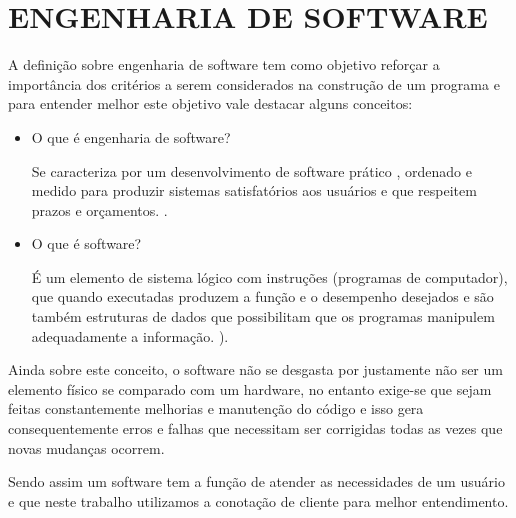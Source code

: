 \documentclass[
	12pt,				%
	oneside,			%
	a4paper,			%
  section=TITLE,
	brazil,				%
	]{abntex2}
\begin{document}
\section{ENGENHARIA DE SOFTWARE}

A definição sobre engenharia de software tem como objetivo reforçar a
importância dos critérios a serem considerados na construção de um programa e
para entender melhor este objetivo vale destacar alguns conceitos:

\begin{itemize}
  \item O que é engenharia de software?
    \begin{citacao}
      Se caracteriza por um desenvolvimento de software prático , ordenado e
      medido para produzir sistemas satisfatórios aos usuários e que respeitem
      prazos e orçamentos. \cite{pressman}.
    \end{citacao}

  \item O que é software?
    \begin{citacao}
      É um elemento de sistema lógico com instruções (programas de computador), que
      quando executadas produzem a função e o desempenho desejados e são também
      estruturas de dados que possibilitam que os programas manipulem adequadamente
      a informação. \cite{pressman}).
    \end{citacao}
\end{itemize}


Ainda sobre este conceito, o software não se desgasta por justamente não ser um
elemento físico se comparado com um hardware, no entanto exige-se que sejam
feitas constantemente melhorias e manutenção do código e isso gera
consequentemente erros e falhas que necessitam ser corrigidas todas as vezes
que novas mudanças ocorrem.

Sendo assim um software tem a função de atender as necessidades de um usuário e
que neste trabalho utilizamos a conotação de cliente para melhor entendimento.




\end{document}
